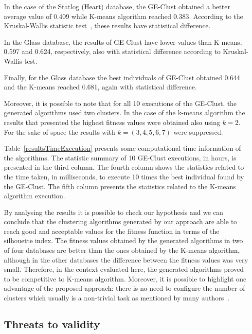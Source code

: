 \documentclass[conference,compsoc]{IEEEtran}
\begin{document}

In the case of the Statlog (Heart) database,  the GE-Clust obtained a better average value of 0.409 while K-means algorithm reached 0.383. According to the  Kruskal-Wallis statistic test~\cite{}, these results have statistical difference.

In the Glass database, the results of GE-Clust have lower values than K-means, 0.597 and 0.624, respectively, also with statistical difference according to Kruskal- Wallis test. 

Finally, for the Glass database the best individuals of GE-Clust obtained 0.644 and the K-means reached 0.681, again with statistical difference.

Moreover, it is possible to note that for all 10 executions of the GE-Clust, the generated algorithms used two clusters. In the case of the k-means algorithm the results that presented the highest fitness values were obtained also using $k=2$. For the sake of space the results with $k = (3,4,5,6,7)$ were suppressed.

Table~\ref{resultsTimeExecution} presents some computational time information of the algorithms. The statistic summary of 10 GE-Clust executions, in hours, is presented in the third column. The fourth column shows the statistics related to the time taken, in milliseconds, to execute 10 times the best individual found by the GE-Clust. The fifth column presents the statistics related to the K-means algorithm execution.

By analysing the results it is possible to check our hypothesis and we can conclude that the clustering algorithms generated by our approach are able to reach good and acceptable values for the fitness function in terms of  the silhouette index. The fitness values obtained by the generated algorithms in two of four databases are better than the ones obtained by the K-means algorithm, although in the other databases the difference between the fitness values was very small. Therefore, in the context evaluated here, the generated algorithms proved to be competitive to K-means algorithm. Moreover, it is possible to highlight one advantage of the proposed approach: there is no need to configure the number of clusters which usually is a non-trivial task as mentioned by many authors~\cite{pham2005selection, yan2005methods, tibshirani2001estimating}.


\subsection{Threats to validity}
\end{document}
